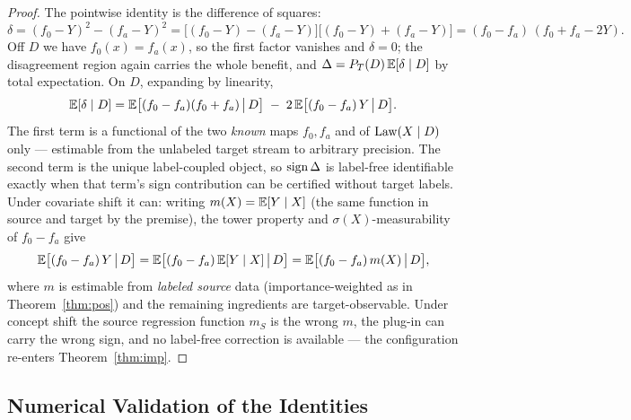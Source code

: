 \begin{proof}
The pointwise identity is the difference of squares:
\[
\delta=(f_0-Y)^2-(f_a-Y)^2
=\bigl[(f_0-Y)-(f_a-Y)\bigr]\bigl[(f_0-Y)+(f_a-Y)\bigr]
=(f_0-f_a)\,(f_0+f_a-2Y).
\]
Off $D$ we have $f_0(x)=f_a(x)$, so the first factor vanishes and $\delta=0$; the
disagreement region again carries the whole benefit, and
$\Delta=P_T(D)\,\mathbb{E}[\delta\mid D]$ by total expectation. On $D$, expanding by linearity,
\[
\mathbb{E}[\delta\mid D]
=\mathbb{E}\bigl[(f_0-f_a)(f_0+f_a)\,\big|\,D\bigr]\;-\;2\,\mathbb{E}\bigl[(f_0-f_a)\,Y\,\big|\,D\bigr].
\]
The first term is a functional of the two \emph{known} maps $f_0,f_a$ and of
$\mathrm{Law}(X\mid D)$ only --- estimable from the unlabeled target stream to arbitrary
precision. The second term is the unique label-coupled object, so $\operatorname{sign}\Delta$ is
label-free identifiable exactly when that term's sign contribution can be certified
without target labels. Under covariate shift it can: writing $m(X)=\mathbb{E}[Y\mid X]$ (the
same function in source and target by the premise), the tower property and
$\sigma(X)$-measurability of $f_0-f_a$ give
\[
\mathbb{E}\bigl[(f_0-f_a)\,Y\,\big|\,D\bigr]
=\mathbb{E}\bigl[(f_0-f_a)\,\mathbb{E}[Y\mid X]\,\big|\,D\bigr]
=\mathbb{E}\bigl[(f_0-f_a)\,m(X)\,\big|\,D\bigr],
\]
where $m$ is estimable from \emph{labeled source} data (importance-weighted as in
Theorem~\ref{thm:pos}) and the remaining ingredients are target-observable. Under
concept shift the source regression function $m_S$ is the wrong $m$, the plug-in can
carry the wrong sign, and no label-free correction is available --- the configuration
re-enters Theorem~\ref{thm:imp}. \qedhere
\end{proof}

\subsection{Numerical Validation of the Identities}
\label{sec:t2-disagree-validation}

